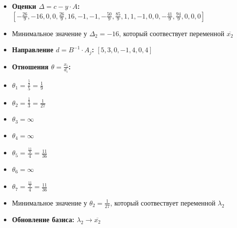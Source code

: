 \begin{itemize}
\begin{itemize}
$[1, 1, \frac{50}{9}, - \frac{85}{9}, 1, 1, 1]$
\item \textbf{Оценки $\Delta = c - y \cdot A$:}
$[- \frac{26}{9}, -16, 0, 0, \frac{26}{9}, 16, -1, -1, - \frac{50}{9}, \frac{85}{9}, 1, 1, -1, 0, 0, - \frac{41}{9}, \frac{94}{9}, 0, 0, 0]$
\item Минимальное значение у  $\Delta_{2} = -16$, который соотвествует переменной $\overline{x_2}$
\item \textbf{Направление $d = B^{-1} \cdot A_j$:}
$[5, 3, 0, -1, 4, 0, 4]$
\item \textbf{Отношения $\theta = \frac{x_i}{d_i}$:}
\item $\theta_{1} = \frac{\frac{5}{9}}{5} = \frac{1}{9}$
\item $\theta_{2} = \frac{\frac{1}{9}}{3} = \frac{1}{27}$
\item $\theta_{3} = \infty$
\item $\theta_{4} = \infty$
\item $\theta_{5} = \frac{\frac{11}{9}}{4} = \frac{11}{36}$
\item $\theta_{6} = \infty$
\item $\theta_{7} = \frac{\frac{11}{9}}{4} = \frac{11}{36}$
\item Минимальное значение у  $\theta_{2} = \frac{1}{27}$, который соотвествует переменной $\lambda_2$
\item \textbf{Обновление базиса: $\lambda_2 \rightarrow \overline{x_2}$}
\end{itemize}
\newpage

\end{itemize}
